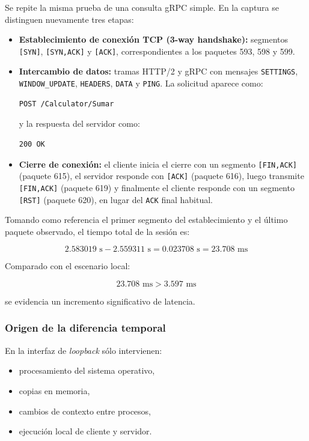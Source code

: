 \documentclass[a4paper,12pt]{article}
\begin{document}
Se repite la misma prueba de una consulta gRPC simple. En la captura se distinguen nuevamente tres etapas:

\begin{itemize}
    \item \textbf{Establecimiento de conexión TCP (3-way handshake):} segmentos \texttt{[SYN]}, \texttt{[SYN,ACK]} y \texttt{[ACK]}, correspondientes a los paquetes 593, 598 y 599.
    
    \item \textbf{Intercambio de datos:} tramas HTTP/2 y gRPC con mensajes \texttt{SETTINGS}, \texttt{WINDOW\_UPDATE}, \texttt{HEADERS}, \texttt{DATA} y \texttt{PING}. La solicitud aparece como:
    
\begin{verbatim}
POST /Calculator/Sumar
\end{verbatim}

y la respuesta del servidor como:

\begin{verbatim}
200 OK
\end{verbatim}

    \item \textbf{Cierre de conexión:} el cliente inicia el cierre con un segmento \texttt{[FIN,ACK]} (paquete 615), el servidor responde con \texttt{[ACK]} (paquete 616), luego transmite \texttt{[FIN,ACK]} (paquete 619) y finalmente el cliente responde con un segmento \texttt{[RST]} (paquete 620), en lugar del \texttt{ACK} final habitual.
\end{itemize}

Tomando como referencia el primer segmento del establecimiento y el último paquete observado, el tiempo total de la sesión es:

\[
2.583019 \text{ s} - 2.559311 \text{ s} = 0.023708 \text{ s} = 23.708 \text{ ms}
\]

Comparado con el escenario local:

\[
23.708 \text{ ms} > 3.597 \text{ ms}
\]

se evidencia un incremento significativo de latencia.

\subsubsection{Origen de la diferencia temporal}

En la interfaz de \textit{loopback} sólo intervienen:

\begin{itemize}
    \item procesamiento del sistema operativo,
    \item copias en memoria,
    \item cambios de contexto entre procesos,
    \item ejecución local de cliente y servidor.
\end{itemize}
\end{document}
